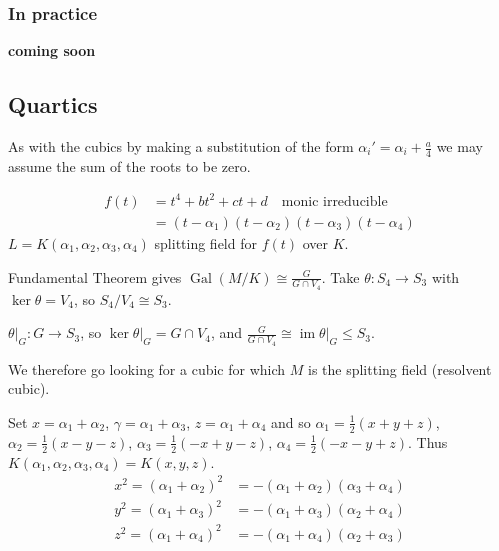 \documentclass{article}
\DeclareMathOperator{\Gal}{Gal}
\begin{document}
\subsubsection*{In practice}
\textbf{coming soon}

\subsection*{Quartics}
As with the cubics by making a substitution of the form $\alpha_i' = \alpha_i + \frac{a}{4}$ we may assume the sum of the roots to be zero.

\begin{align*}
    f(t) &= t^4 + b t^2 + ct + d \quad \text{monic irreducible} \\
         &= (t - \alpha_1)(t-\alpha_2)(t-\alpha_3)(t-\alpha_4)
\end{align*}
$L = K(\alpha_1, \alpha_2, \alpha_3, \alpha_4)$ splitting field for $f(t)$ over $K$.

\begin{center}
\end{center}

Fundamental Theorem gives $\Gal(M/K) \cong \frac{G}{G \cap V_4}$.
Take $\theta: S_4 \to S_3$ with $\ker \theta = V_4$, so $S_4 / V_4 \cong S_3$.

$\theta|_G : G \to S_3$, so $\ker \theta|_G = G \cap V_4$, and $\frac{G}{G \cap V_4} \cong \operatorname{im} \theta|_G \leq S_3$.

We therefore go looking for a cubic for which $M$ is the splitting field (resolvent cubic).

Set $x= \alpha_1 + \alpha_2$, $\gamma = \alpha_1 + \alpha_3$, $z = \alpha_1 + \alpha_4$ and so $\alpha_1 = \frac{1}{2}(x+y+z)$, $\alpha_2=\frac{1}{2}(x - y - z)$, $\alpha_3=\frac{1}{2}(-x+y-z)$, $\alpha_4=\frac{1}{2}(-x-y+z)$.
Thus $K(\alpha_1, \alpha_2, \alpha_3, \alpha_4)=K(x,y,z)$.
\begin{align*}
    x^2=(\alpha_1+\alpha_2)^2&=-(\alpha_1+\alpha_2)(\alpha_3+\alpha_4)\\
    y^2=(\alpha_1+\alpha_3)^2&=-(\alpha_1+\alpha_3)(\alpha_2+\alpha_4)\\
    z^2=(\alpha_1+\alpha_4)^2&=-(\alpha_1+\alpha_4)(\alpha_2+\alpha_3)
\end{align*}
\end{document}

